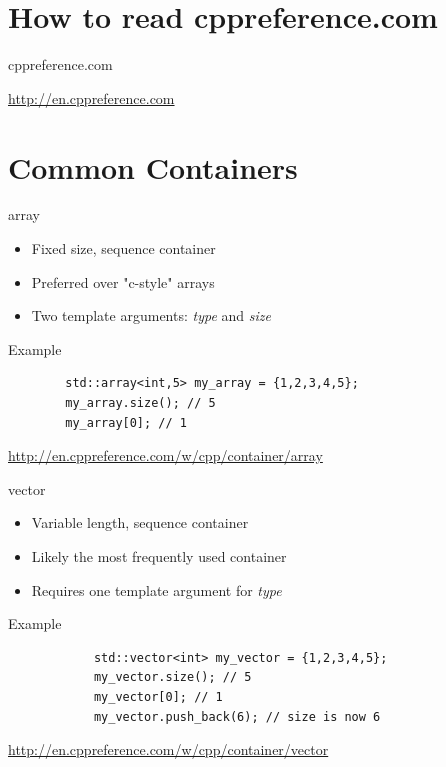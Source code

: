\documentclass{beamer}
\begin{document}
\section{How to read cppreference.com}

\begin{frame}{cppreference.com}
	\begin{center}
		\url{http://en.cppreference.com}
	\end{center}
\end{frame}


\section{Common Containers}

\begin{frame}[fragile]{array}
	\begin{itemize}
		\item Fixed size, sequence container
		\item Preferred over "c-style" arrays
		\item Two template arguments: \textit{type} and \textit{size}
	\end{itemize}
	\bigskip
	\begin{exampleblock}{Example}
	\begin{verbatim}
		std::array<int,5> my_array = {1,2,3,4,5};
		my_array.size(); // 5
		my_array[0]; // 1
	\end{verbatim}
	\end{exampleblock}
	\bigskip
	\begin{center}
	\tiny \url{http://en.cppreference.com/w/cpp/container/array}
	\end{center}
\end{frame}

\begin{frame}[fragile]{vector}
	\begin{itemize}
		\item Variable length, sequence container
		\item Likely the most frequently used container
		\item Requires one template argument for \textit{type}
	\end{itemize}
	\bigskip
	\begin{exampleblock}{Example}
		\begin{verbatim}
			std::vector<int> my_vector = {1,2,3,4,5};
			my_vector.size(); // 5
			my_vector[0]; // 1
			my_vector.push_back(6); // size is now 6
		\end{verbatim}
	\end{exampleblock}
	\bigskip
	\begin{center}
	\tiny \url{http://en.cppreference.com/w/cpp/container/vector}
	\end{center}
\end{frame}
\end{document}
